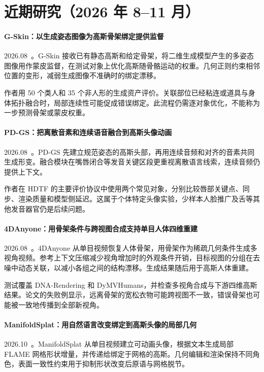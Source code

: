 \section{近期研究（2026 年 8--11 月）}
\paragraph{G-Skin：以生成姿态图像为高斯骨架绑定提供监督}
2026.08~\cite{2608_01726}。G-Skin 接收已有静态高斯和给定骨架，将二维生成模型产生的多姿态图像用作蒙皮监督，在测试对象上优化高斯随骨骼运动的权重。几何正则约束相邻位置的变形，减弱生成图像不准确时的绑定漂移。

作者用 50 个类人和 35 个非人形的生成资产评价。关联部位已经粘连或道具与身体拓扑融合时，局部连续性可能促成错误绑定。此流程仍需逐对象优化，不能称为一步预测骨架或蒙皮权重。

\paragraph{PD-GS：把离散音素和连续语音融合到高斯头像动画}
2026.08~\cite{2608_05218}。PD-GS 先建立规范姿态的高斯头部，再用连续音频和对齐的音素共同生成形变。融合模块在嘴唇闭合等发音关键区段更重视离散语言线索，连续音频仍提供上下文。

作者在 HDTF 的主要评价协议中使用两个常见对象，分别比较唇部关键点、同步、渲染质量和模型侧延迟。这属于个体特定头像实验，少样本人脸推广及舌等其他发音器官仍是后续问题。

\paragraph{4DAnyone：用骨架条件与跨视图合成支持单目人体四维重建}
2026.08~\cite{2608_20335}。4DAnyone 从单目视频恢复人体骨架，用骨架作为稀疏几何条件生成多视角视频。参考上下文压缩减少视角增加时的外观条件开销，目标视图的分组在去噪中动态关联，以减小各组之间的结构漂移。生成结果随后用于高斯人体重建。

测试覆盖 DNA-Rendering 和 DyMVHumans，并检查多视角合成与下游四维高斯结果。论文的失败例显示，远离骨架的宽松衣物可能跨视图不一致，错误骨架也可能被一致地传播到全部新视角。

\paragraph{ManifoldSplat：用自然语言改变绑定到高斯头像的局部几何}
2026.10~\cite{2610_03599}。ManifoldSplat 从单目视频建立可动画头像，根据文本生成局部 FLAME 网格形状增量，并传递给绑定于网格的高斯。几何编辑和渲染保持不同角色，表面一致性约束用于抑制形状改变后原语与网格脱节。

